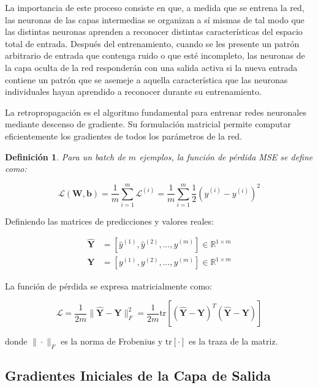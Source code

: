 \documentclass[12pt]{article}
\newtheorem {definition}{Definición}
\begin{document}
La importancia de este proceso consiste en que, a medida que se entrena la red, las neuronas de las capas intermedias se organizan a sí mismas de tal modo que las distintas neuronas aprenden a reconocer distintas características del espacio total de entrada. Después del entrenamiento, cuando se les presente un patrón arbitrario de entrada que contenga ruido o que esté incompleto, las neuronas de la capa oculta de la red responderán con una salida activa si la nueva entrada contiene un patrón que se asemeje a aquella característica que las neuronas individuales hayan aprendido a reconocer durante su entrenamiento.

La retropropagación es el algoritmo fundamental para entrenar redes neuronales mediante descenso de gradiente. Su formulación matricial permite computar eficientemente los gradientes de todos los parámetros de la red.

\begin{definition}
  Para un batch de $m$ ejemplos, la función de pérdida MSE se define como:

\begin{equation}
\mathcal{L}(\mathbf{W}, \mathbf{b}) = \frac{1}{m} \sum_{i=1}^m \mathcal{L}^{(i)} = \frac{1}{m} \sum_{i=1}^m \frac{1}{2} (\hat{y}^{(i)} - y^{(i)})^2
\end{equation}  
\end{definition}

Definiendo las matrices de predicciones y valores reales:

\begin{align}
\hat{\mathbf{Y}} &= [\hat{y}^{(1)}, \hat{y}^{(2)}, \dots, \hat{y}^{(m)}] \in \mathbb{R}^{1 \times m} \\
\mathbf{Y} &= [y^{(1)}, y^{(2)}, \dots, y^{(m)}] \in \mathbb{R}^{1 \times m}
\end{align}

La función de pérdida se expresa matricialmente como:

\begin{equation}
\mathcal{L} = \frac{1}{2m} \|\hat{\mathbf{Y}} - \mathbf{Y}\|_F^2 = \frac{1}{2m} \text{tr}\left[(\hat{\mathbf{Y}} - \mathbf{Y})^T(\hat{\mathbf{Y}} - \mathbf{Y})\right]
\end{equation}

donde $\|\cdot\|_F$ es la norma de Frobenius y $\text{tr}[\cdot]$ es la traza de la matriz.

\subsection{Gradientes Iniciales de la Capa de Salida}
\end{document}
